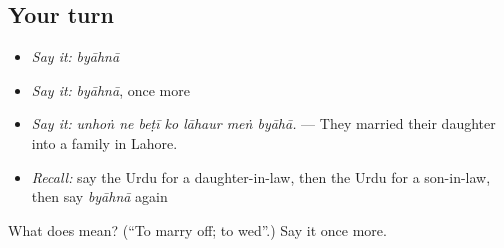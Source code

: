 \subsection*{Your turn}
\begin{itemize}
\raggedright
  \item \emph{Say it:} \emph{byāhnā}
  \item \emph{Say it:} \emph{byāhnā}, once more
  \item \emph{Say it:} \emph{unhoṅ ne beṭī ko lāhaur meṅ byāhā.} — They married their daughter into a family in Lahore.
  \item \emph{Recall:} say the Urdu for a daughter-in-law, then the Urdu for a son-in-law, then say \emph{byāhnā} again
\end{itemize}

\begin{tcolorbox}[breakable,colback=teal!4,colframe=teal!35!black,title={Before you move on}]
What does  mean? (\textquotedblleft{}To marry off; to wed\textquotedblright{}.) Say it once more.
\end{tcolorbox}
